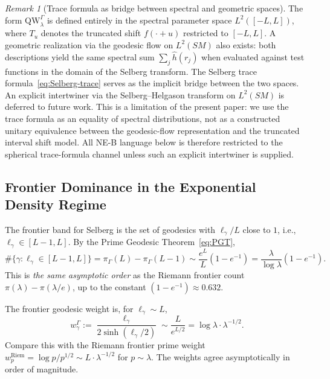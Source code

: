\documentclass[12pt,a4paper]{article}
\theoremstyle{definition}
\theoremstyle{remark}
\newtheorem{remark}[theorem]{Remark}
\newcommand{\QW}{\mathrm{QW}}
\begin{document}
\begin{remark}[Trace formula as bridge between spectral and geometric spaces]
\label{rem:two-spaces}
The form $\QW^\Gamma_\lambda$ is defined entirely in the spectral parameter
space $L^2([-L,L])$, where $T_u$ denotes the truncated shift $f(\cdot + u)$
restricted to $[-L,L]$.  A geometric realization via the geodesic flow on
$L^2(SM)$ also exists: both descriptions yield the same spectral sum
$\sum_j \hat{h}(r_j)$ when evaluated against test functions in the domain of
the Selberg transform.  The Selberg trace formula~\eqref{eq:Selberg-trace}
serves as the implicit bridge between the two spaces.  An explicit intertwiner
via the Selberg--Helgason transform on $L^2(SM)$ is deferred to future work.
This is a limitation of the present paper: we use the trace formula as an
equality of spectral distributions, not as a constructed unitary equivalence
between the geodesic-flow representation and the truncated interval shift
model.  All NE-B language below is therefore restricted to the spherical
trace-formula channel unless such an explicit intertwiner is supplied.
\end{remark}

\subsection{Frontier Dominance in the Exponential Density Regime}

The frontier band for Selberg is the set of geodesics with
$\ell_\gamma / L$ close to $1$, i.e.,\ $\ell_\gamma \in [L-1, L]$. By the Prime
Geodesic Theorem~\eqref{eq:PGT},
\begin{equation}
\label{eq:frontier-count-Sel}
\#\{\gamma : \ell_\gamma \in [L-1, L]\} = \pi_\Gamma(L) - \pi_\Gamma(L-1)
\sim \frac{e^L}{L}(1 - e^{-1}) = \frac{\lambda}{\log\lambda}(1 - e^{-1}).
\end{equation}
This is \emph{the same asymptotic order} as the Riemann frontier count
$\pi(\lambda) - \pi(\lambda/e)$, up to the constant $(1-e^{-1}) \approx 0.632$.

The frontier geodesic weight is, for $\ell_\gamma \sim L$,
\begin{equation}
\label{eq:frontier-weight-Sel}
w^\Gamma_\gamma := \frac{\ell_\gamma}{2\sinh(\ell_\gamma/2)} \sim \frac{L}{e^{L/2}} = \log\lambda \cdot \lambda^{-1/2}.
\end{equation}
Compare this with the Riemann frontier prime weight
$w_p^{\mathrm{Riem}} = \log p / p^{1/2} \sim L \cdot \lambda^{-1/2}$ for
$p \sim \lambda$. The weights agree asymptotically in order of magnitude.
\end{document}

